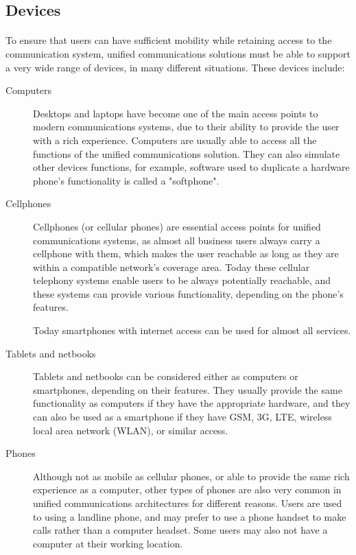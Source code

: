 \subsection{Devices}

\paragraph{}
To ensure that users can have sufficient mobility while retaining access to the communication system, unified communications solutions must be able to support a very wide range of devices, in many different situations. These devices include:

\begin{description}

\item[Computers]
Desktops and laptops have become one of the main access points to modern communications systems, due to their ability to provide the user with a rich experience. Computers are usually able to access all the functions of the unified communications solution. They can also simulate other devices functions, for example, software used to duplicate a hardware phone's functionality is called a "softphone".

\item[Cellphones]
Cellphones (or cellular phones) are essential access points for unified communications systems, as almost all business users always carry a cellphone with them, which makes the user reachable as long as they are within a compatible network's coverage area. Today these cellular telephony systems enable users to be always potentially reachable, and these systems can provide various functionality, depending on the phone's features.

Today smartphones with internet access can be used for almost all services.

\item[Tablets and netbooks]
Tablets and netbooks can be considered either as computers or smartphones, depending on their features. They usually provide the same functionality as computers if they have the appropriate hardware, and they can also be used as a smartphone if they have GSM, 3G, LTE, wireless local area network (WLAN), or similar access.

\item[Phones]
Although not as mobile as cellular phones, or able to provide the same rich experience as a computer, other types of phones are also very common in unified communications architectures for different reasons. Users are used to using a landline phone, and may prefer to use a phone handset to make calls rather than a computer headset. Some users may also not have a computer at their working location.


\end{description}

